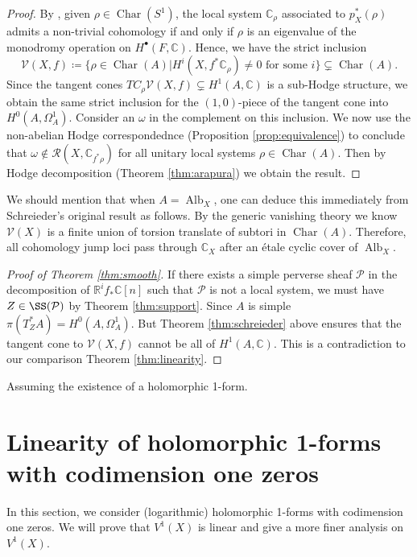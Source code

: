 \documentclass[12pt,reqno]{amsart}
\theoremstyle{question}
\theoremstyle{definition}
\theoremstyle{remark}
\theoremstyle{cited}
\theoremstyle{citeddef}
\DeclareMathOperator{\Alb}{Alb}
\DeclareMathOperator{\Char}{Char}
\newcommand{\sP}{\mathcal{P}}
\newcommand{\sR}{\mathcal{R}}
\newcommand\sV{{\mathcal V}}
\newcommand{\bbC}{\mathbb{C}}
\newcommand{\bbR}{\mathbb{R}}
\begin{document}
\begin{proof}
By \cite[Proposition 5.4]{LW18}, given $\rho\in \Char(S^1)$, the local system $\bbC_{\rho}$ associated to $p_X^*(\rho)$ admits
a non-trivial cohomology if and only if $\rho$ is an eigenvalue of the monodromy operation on $H^{\bullet}(F, \bbC)$. Hence, 
we have the strict inclusion
\[\sV(X, f) \coloneqq \{\rho\in\Char(A)| H^i(X, f^*\bbC_{\rho}) \neq 0 \text{ for some }i\}\subsetneq \Char(A).\]
Since the tangent cones $TC_{\rho}\sV(X, f)\subsetneq H^1(A, \bbC)$ is a sub-Hodge structure, we obtain the same strict inclusion
for the $(1,0)$-piece of the tangent cone into $H^0(A, \Omega_A^1)$. Consider an $\omega$ in the complement on this inclusion. We now use the non-abelian Hodge correspondednce (Proposition
\ref{prop:equivalence}) to conclude that $\omega\notin \sR(X, \bbC_{f^*\rho})$ for all unitary local systems $\rho\in \Char(A)$. Then
by Hodge decomposition (Theorem \ref{thm:arapura}) we obtain the result.

\end{proof}
We should mention that when $A = \Alb_X$, one can deduce this immediately from Schreieder's original result as follows. By
the generic vanishing theory we know $\sV(X)$ is a finite union of torsion translate of subtori in $\Char(A)$. Therefore, 
all cohomology jump loci pass through $\bbC_X$ after an \'etale cyclic cover of $\Alb_X$.

\begin{proof}[Proof of Theorem \ref{thm:smooth}]
If there exists a simple perverse sheaf $\sP$ in the decomposition of $\bbR^i f_*\bbC[n]$ such that $\sP$ is not a local system,
we must have $Z\in\SS(\sP)$ by Theorem \ref{thm:support}. Since $A$ is simple $\pi(T^*_ZA) = H^0(A, \Omega_A^1)$. 
But Theorem \ref{thm:schreieder} above ensures that the tangent cone to $\sV(X, f)$ cannot be all of $H^1(A, \bbC)$.
This is a contradiction to our comparison Theorem \ref{thm:linearity}.

\end{proof}


Assuming the existence of a holomorphic 1-form.





\section{Linearity of holomorphic 1-forms with codimension one zeros}

In this section, we consider (logarithmic) holomorphic 1-forms with codimension one zeros. We will prove that $V^1(X)$ is linear and give a more finer analysis on $V^1(X)$. 
\end{document}
